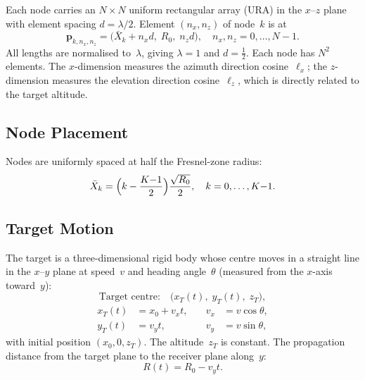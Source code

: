 \documentclass[11pt,a4paper]{article}
\begin{document}
Each node carries an $N\times N$ uniform rectangular array (URA) in
the $x$--$z$ plane with element spacing $d=\lambda/2$.  Element
$(n_x,n_z)$ of node~$k$ is at
\begin{equation}
  \mathbf{p}_{k,n_x,n_z}
  = \bigl(\bar{X}_k + n_x d,\;R_0,\;n_z d\bigr),
  \quad n_x,n_z=0,\ldots,N{-}1.
  \label{eq:element_pos}
\end{equation}
All lengths are normalised to~$\lambda$, giving $\lambda=1$ and
$d=\tfrac12$.  Each node has $N^2$ elements.  The $x$-dimension
measures the azimuth direction cosine~$\ell_x$; the $z$-dimension
measures the elevation direction cosine~$\ell_z$, which is directly
related to the target altitude.

\subsection{Node Placement}

Nodes are uniformly spaced at half the Fresnel-zone radius:
\begin{equation}
  \bar{X}_k = \Bigl(k - \frac{K{-}1}{2}\Bigr)
  \frac{\sqrt{R_0}}{2},
  \quad k=0,\ldots,K{-}1.
  \label{eq:node_positions}
\end{equation}

\subsection{Target Motion}
\label{sec:target_model}

The target is a three-dimensional rigid body whose centre moves in a
straight line in the $x$--$y$ plane at speed~$v$ and heading
angle~$\theta$ (measured from the $x$-axis toward~$y$):
\begin{equation}
  \text{Target centre:}\quad
  \bigl(x_T(t),\;y_T(t),\;z_T\bigr),
  \label{eq:target_pos}
\end{equation}
\begin{align}
  x_T(t) &= x_0 + v_x t, &\quad v_x &= v\cos\theta,
  \label{eq:xT}\\
  y_T(t) &= v_y t,        &\quad v_y &= v\sin\theta,
  \label{eq:yT}
\end{align}
with initial position $(x_0,0,z_T)$.  The altitude~$z_T$ is
constant.  The propagation distance from the target plane to the
receiver plane along~$y$:
\begin{equation}
  R(t) = R_0 - v_y t.
  \label{eq:Rt}
\end{equation}

\end{document}
